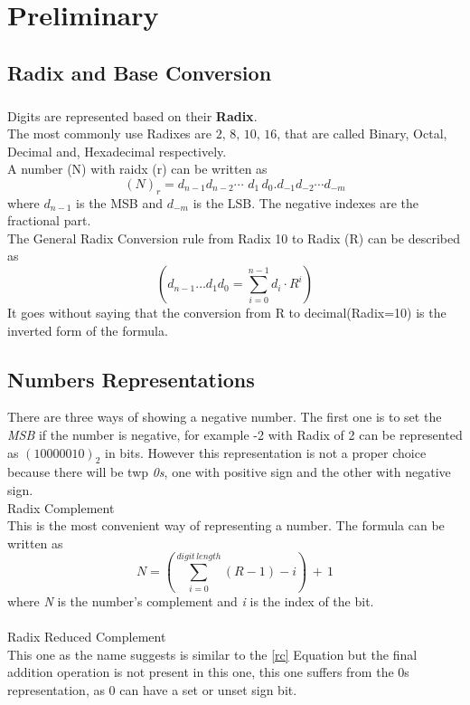 \chapter{Preliminary}
\section{Radix and Base Conversion}
\paragraph{}
Digits are represented based on their \textbf{Radix}.\\
The most commonly use Radixes are \(2,\,8,\,10,\,16\), that are called Binary, Octal, Decimal and, Hexadecimal respectively.\\
A number (N) with raidx (r) can be written as\large{\[
(N)_{r} = d_{n-1} d_{n-2}\cdots\,\,d_{1}\,d_{0} . d_{-1} d_{-2} \cdots d_{-m}
\]}
where \(d_{n-1}\) is the MSB and \(d_{-m}\) is the LSB. The negative indexes are the fractional part.\\
The General Radix Conversion rule from Radix 10 to Radix (R) can be described as \[
\left(d_{n-1}\dots d_{1}d_{0}=\sum _{i=0}^{n-1}d_{i}\cdot R^{i}\right)
\]\label{conv}
It goes without saying that the conversion from R to decimal(Radix=10) is the inverted form of the formula.
\section{Numbers Representations}
There are three ways of showing a negative number. The first one is to set the \textit{MSB} if the number is negative, for example -2 with Radix of 2 can be represented as \((10000010)_{2}\) in bits. However this representation is not a proper choice because there will be twp \textit{0s}, one with positive sign and the other with negative sign.\\
\newline
Radix Complement\\
This is the most convenient way of representing a number.
The formula can be written as
\[
	N = \left(\sum_{i=0}^{digit\,length}\left(R-1\right) - i \right)\,+\,1
\]\label{rc}
where \textit{N} is the number's complement and \textit{i} is the index of the bit.\\ \\
Radix Reduced Complement\\
This one as the name suggests is similar to the \ref{rc} Equation but the final addition operation is not present in this one, this one suffers from the 0s representation, as 0 can have a set or unset sign bit.\\
